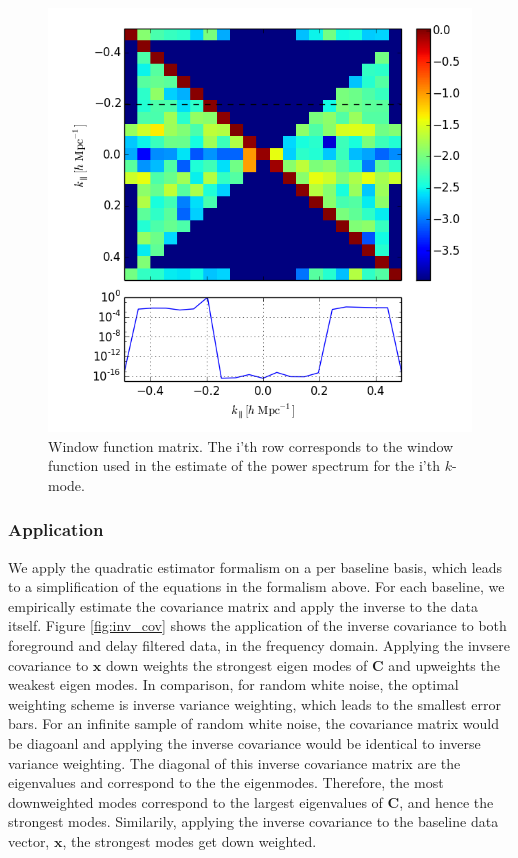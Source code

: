 \documentclass[twocolumn,numberedappendix]{emulateapj} \shorttitle{PSA64}
\newcommand{\x}{\mathbf{x}} \newcommand{\xhat}{\hat{\mathbf{x}}}
\newcommand{\C}{\mathbf{C}} \newcommand{\Q}{\mathbf{Q}}
\begin{document}
\begin{figure}[h!]\centering
\includegraphics[width=\columnwidth, height=\columnwidth]{plots/window.png}
\caption{Window function matrix. The i'th row corresponds to the window function
used in the estimate of the power spectrum for the i'th $k$-mode.}
\label{fig:window_func}
\end{figure}


\subsubsection{Application}

We apply the quadratic estimator formalism on a per baseline basis, which leads
to a simplification of the equations in the formalism above. For each
baseline, we empirically estimate the covariance matrix and apply the inverse to
the data itself. Figure \ref{fig:inv_cov} shows the application of the
inverse covariance to both foreground and delay filtered data, in the frequency
domain. Applying the invsere covariance to $\x$ down weights the strongest
eigen modes of $\mathbf{C}$ and upweights the weakest eigen modes. In
comparison, for random white noise, the optimal weighting scheme is inverse
variance weighting, which leads to the smallest error bars. For an infinite
sample of random white noise, the covariance matrix would be diagoanl and
applying the inverse covariance would be identical to inverse variance
weighting. The diagonal of this inverse covariance matrix are the eigenvalues
and correspond to the the eigenmodes. Therefore, the most downweighted modes
correspond to the largest eigenvalues of $\C$, and hence the strongest modes.
Similarily, applying the inverse covariance to the baseline data vector, $\x$,
the strongest modes get down weighted. 
\end{document}
